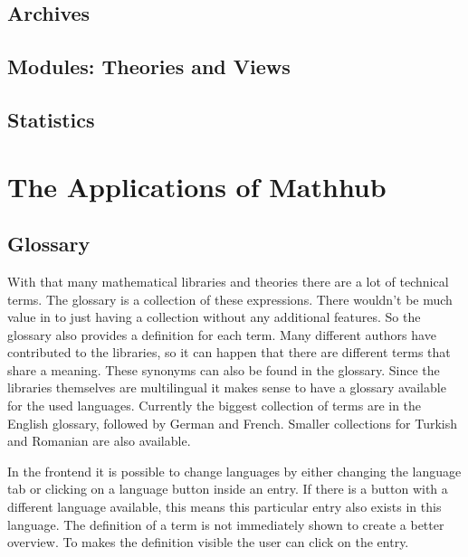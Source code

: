 \documentclass[11pt,a4paper]{article}
\begin{document}
	\subsection{Archives}
	\subsection{Modules: Theories and Views}
	\subsection{Statistics}

\section{The Applications of Mathhub}
	\subsection{Glossary}
With that many mathematical libraries and theories there are a lot of technical terms. The glossary is a collection of these expressions. There wouldn't be much value in to just having a collection without any additional features. So the glossary also provides a definition for each term. Many different authors have contributed to the libraries, so it can happen that there are different terms that share a meaning. These synonyms can also be found in the glossary. Since the libraries themselves are multilingual it makes sense to have a glossary available for the used languages. Currently the biggest collection of terms are in the English glossary, followed by German and French. Smaller collections for Turkish and Romanian are also available.

In the frontend it is possible to change languages by either changing the language tab or clicking on a language button inside an entry. If there is a button with a different language available, this means this particular entry also exists in this language. The definition of a term is not immediately shown to create a better overview. To makes the definition visible the user can click on the entry. 
\end{document}
